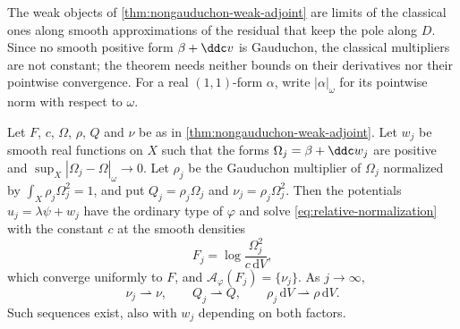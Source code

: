 The weak objects of \cref{thm:nongauduchon-weak-adjoint} are limits of the classical ones along smooth approximations of the residual that keep the pole along $D$. Since no smooth positive form $\beta+\ddc v$ is Gauduchon, the classical multipliers are not constant; the theorem needs neither bounds on their derivatives nor their pointwise convergence. For a real $(1,1)$-form $\alpha$, write $|\alpha|_\omega$ for its pointwise norm with respect to $\omega$.

\begin{theorem}\label{thm:nongauduchon-fixed-pole-recovery}
Let $F$, $c$, $\Omega$, $\rho$, $Q$ and $\nu$ be as in \cref{thm:nongauduchon-weak-adjoint}. Let $w_j$ be smooth real functions on $X$ such that the forms $\Omega_j=\beta+\ddc w_j$ are positive and $\sup_X|\Omega_j-\Omega|_\omega\to0$. Let $\rho_j$ be the Gauduchon multiplier of $\Omega_j$ normalized by $\int_X\rho_j\Omega_j^2=1$, and put $Q_j=\rho_j\Omega_j$ and $\nu_j=\rho_j\Omega_j^2$. Then the potentials $u_j=\lambda\psi+w_j$ have the ordinary type of $\varphi$ and solve \eqref{eq:relative-normalization} with the constant $c$ at the smooth densities
\[
 F_j=\log\frac{\Omega_j^2}{c\,\mathrm dV},
\]
which converge uniformly to $F$, and $\mathcal A_\varphi(F_j)=\{\nu_j\}$. As $j\to\infty$,
\[
 \nu_j\rightharpoonup\nu,\qquad Q_j\rightharpoonup Q,\qquad
 \rho_j\,\mathrm dV\rightharpoonup\rho\,\mathrm dV.
\]
Such sequences exist, also with $w_j$ depending on both factors.
\end{theorem}

